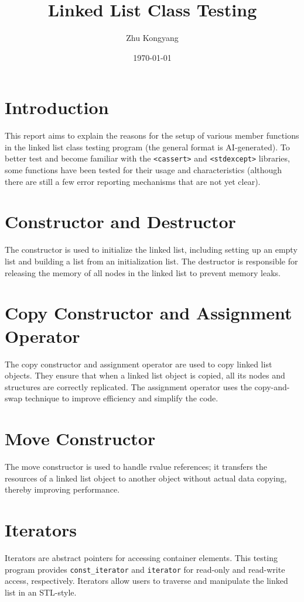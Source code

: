 \documentclass[12pt]{article}
\title{Linked List Class Testing}
\author{Zhu Kongyang}
\date{\today}
\begin{document}
\maketitle

\section{Introduction}
This report aims to explain the reasons for the setup of various member functions in the linked list class testing program (the general format is AI-generated). To better test and become familiar with the \texttt{<cassert>} and \texttt{<stdexcept>} libraries, some functions have been tested for their usage and characteristics (although there are still a few error reporting mechanisms that are not yet clear).

\section{Constructor and Destructor}
The constructor is used to initialize the linked list, including setting up an empty list and building a list from an initialization list. The destructor is responsible for releasing the memory of all nodes in the linked list to prevent memory leaks.

\section{Copy Constructor and Assignment Operator}
The copy constructor and assignment operator are used to copy linked list objects. They ensure that when a linked list object is copied, all its nodes and structures are correctly replicated. The assignment operator uses the copy-and-swap technique to improve efficiency and simplify the code.

\section{Move Constructor}
The move constructor is used to handle rvalue references; it transfers the resources of a linked list object to another object without actual data copying, thereby improving performance.

\section{Iterators}
Iterators are abstract pointers for accessing container elements. This testing program provides \texttt{const\_iterator} and \texttt{iterator} for read-only and read-write access, respectively. Iterators allow users to traverse and manipulate the linked list in an STL-style.
\end{document}

